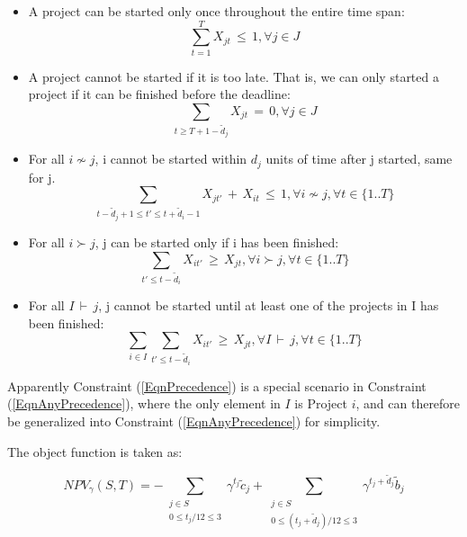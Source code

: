 \documentclass[final,3p,times]{elsarticle}
\begin{document}
\begin{itemize}

\item A project can be started only once throughout the entire time span:
\begin{equation}
\sum\limits_{t=1}^{T} X_{jt}\,\leq\,1,\forall j \in J
\end{equation}

\item A project cannot be started if it is too late. That is, we can only started a project if it can be finished before the deadline:
\begin{equation}
\sum\limits_{t\geq T+1-\tilde{d}_j} X_{jt}\,=\,0, \forall j \in J
\end{equation}

\item For all $i \nsim j$, i cannot be started within $d_j$ units of time after j started, same for j.
\begin{equation}
\sum\limits_{t-\tilde{d}_j+1\leq t'\leq t+\tilde{d}_i-1} X_{jt'}\,+\,X_{it}\,\leq\,1,\forall i \nsim j, \forall t \in \{1 .. T\}
\end{equation}

\item For all $i \succ j$, j can be started only if i has been finished:
\begin{equation}
\label{EqnPrecedence}
\sum\limits_{t'\leq t-\tilde{d}_i} X_{it'} \,\geq\, X_{jt},\forall i\succ j, \forall t \in \{1 .. T\} 
\end{equation}

\item For all $I\,\vdash\,j$, j cannot be started until at least one of the projects in I has been finished:
\begin{equation}
\label{EqnAnyPrecedence}
\sum\limits_{i\in I}\sum\limits_{t'\leq t-\tilde{d}_i} X_{it'}\,\geq\,X_{jt},\forall I\,\vdash\,j, \forall t \in \{1 .. T\}
\end{equation}
\end{itemize}

Apparently Constraint (\ref{EqnPrecedence}) is a special scenario in Constraint (\ref{EqnAnyPrecedence}), where the only element in $I$ is Project $i$, and can therefore be generalized into Constraint (\ref{EqnAnyPrecedence}) for simplicity.

The object function is taken as:

\begin{equation}
	NPV_{\gamma} ( S,T ) = - \sum\limits_{\substack{j \in S\\0 \leq t_j/12 \leq 3}} \gamma^{t_j} \tilde{c}_j + \sum\limits_{\substack{j \in S\\0 \leq (t_j+\tilde{d}_j)/12 \leq 3}} \gamma^{t_j+\tilde{d}_j} \tilde{b}_j
\end{equation}
\end{document}

